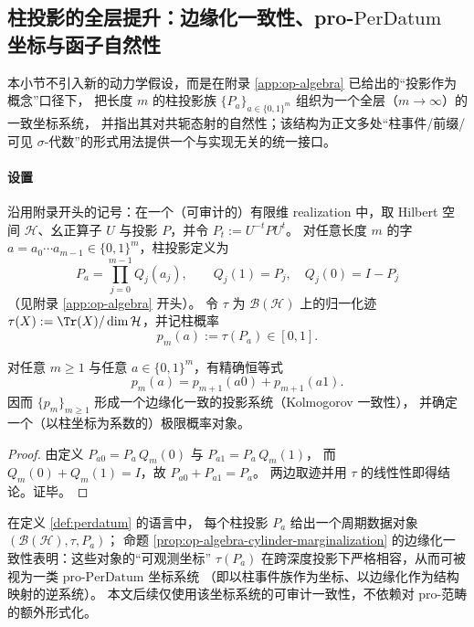 \subsection{柱投影的全层提升：边缘化一致性、pro-\texorpdfstring{$\mathrm{PerDatum}$}{PerDatum} 坐标与函子自然性}\label{subsec:op-algebra-cylinder-properdatum}
本小节不引入新的动力学假设，而是在附录 \ref{app:op-algebra} 已给出的“投影作为概念”口径下，
把长度 \(m\) 的柱投影族 \(\{P_a\}_{a\in\{0,1\}^m}\) 组织为一个全层（\(m\to\infty\)）的一致坐标系统，
并指出其对共轭态射的自然性；该结构为正文多处“柱事件/前缀/可见 \(\sigma\)-代数”的形式用法提供一个与实现无关的统一接口。

\paragraph{设置}
沿用附录开头的记号：在一个（可审计的）有限维 realization 中，取 Hilbert 空间 \(\mathcal{H}\)、幺正算子 \(U\) 与投影 \(P\)，并令
\(
P_t:=U^{-t}PU^t
\)。
对任意长度 \(m\) 的字 \(a=a_0\cdots a_{m-1}\in\{0,1\}^m\)，柱投影定义为
\[
P_a=\prod_{j=0}^{m-1}Q_j(a_j),
\qquad
Q_j(1)=P_j,\quad Q_j(0)=I-P_j
\]
（见附录 \ref{app:op-algebra} 开头）。
令 \(\tau\) 为 \(\mathcal{B}(\mathcal{H})\) 上的归一化迹 \(\tau(X):=\Tr(X)/\dim\mathcal{H}\)，并记柱概率
\[
p_m(a):=\tau(P_a)\in[0,1].
\]

\begin{proposition}[柱概率的边缘化一致性]\label{prop:op-algebra-cylinder-marginalization}
对任意 \(m\ge 1\) 与任意 \(a\in\{0,1\}^m\)，有精确恒等式
\[
p_m(a)=p_{m+1}(a0)+p_{m+1}(a1).
\]
因而 \(\{p_m\}_{m\ge 1}\) 形成一个边缘化一致的投影系统（Kolmogorov 一致性），
并确定一个（以柱坐标为系数的）极限概率对象。
\end{proposition}

\begin{proof}
由定义
\(
P_{a0}=P_a\,Q_m(0)
\)
与
\(
P_{a1}=P_a\,Q_m(1)
\)，
而 \(Q_m(0)+Q_m(1)=I\)，故
\(
P_{a0}+P_{a1}=P_a
\)。
两边取迹并用 \(\tau\) 的线性性即得结论。证毕。
\end{proof}

\begin{remark}\label{rem:op-algebra-properdatum-coordinate}
在定义 \ref{def:perdatum} 的语言中，
每个柱投影 \(P_a\) 给出一个周期数据对象 \((\mathcal{B}(\mathcal{H}),\tau,P_a)\)；
命题 \ref{prop:op-algebra-cylinder-marginalization} 的边缘化一致性表明：这些对象的“可观测坐标”
\(\tau(P_a)\) 在跨深度投影下严格相容，从而可被视为一类 pro-\(\mathrm{PerDatum}\) 坐标系统
（即以柱事件族作为坐标、以边缘化作为结构映射的逆系统）。
本文后续仅使用该坐标系统的可审计一致性，不依赖对 pro-范畴的额外形式化。
\end{remark}

